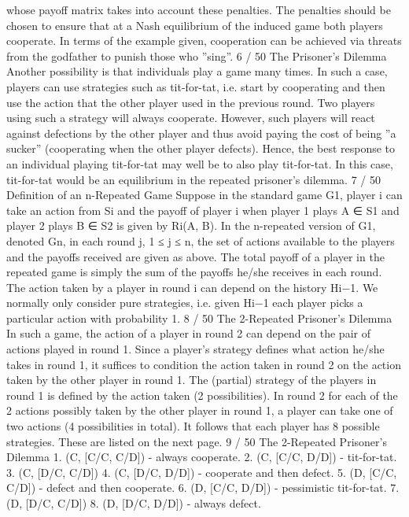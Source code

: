 whose payoff matrix takes into account these penalties.
The penalties should be chosen to ensure that at a Nash
equilibrium of the induced game both players cooperate.
In terms of the example given, cooperation can be achieved via
threats from the godfather to punish those who ”sing”.
6 / 50
The Prisoner’s Dilemma
Another possibility is that individuals play a game many times.
In such a case, players can use strategies such as tit-for-tat, i.e.
start by cooperating and then use the action that the other player
used in the previous round.
Two players using such a strategy will always cooperate. However,
such players will react against defections by the other player and
thus avoid paying the cost of being ”a sucker” (cooperating when
the other player defects).
Hence, the best response to an individual playing tit-for-tat may
well be to also play tit-for-tat. In this case, tit-for-tat would be an
equilibrium in the repeated prisoner’s dilemma.
7 / 50
Definition of an n-Repeated Game
Suppose in the standard game G1, player i can take an action from
Si and the payoff of player i when player 1 plays A ∈ S1 and player
2 plays B ∈ S2 is given by Ri(A, B).
In the n-repeated version of G1, denoted Gn, in each round j,
1 ≤ j ≤ n, the set of actions available to the players and the
payoffs received are given as above.
The total payoff of a player in the repeated game is simply the sum
of the payoffs he/she receives in each round.
The action taken by a player in round i can depend on the history
Hi−1. We normally only consider pure strategies, i.e. given Hi−1
each player picks a particular action with probability 1.
8 / 50
The 2-Repeated Prisoner’s Dilemma
In such a game, the action of a player in round 2 can depend on
the pair of actions played in round 1.
Since a player’s strategy defines what action he/she takes in round
1, it suffices to condition the action taken in round 2 on the action
taken by the other player in round 1.
The (partial) strategy of the players in round 1 is defined by the
action taken (2 possibilities). In round 2 for each of the 2 actions
possibly taken by the other player in round 1, a player can take one
of two actions (4 possibilities in total).
It follows that each player has 8 possible strategies. These are
listed on the next page.
9 / 50
The 2-Repeated Prisoner’s Dilemma
1. (C, [C/C, C/D]) - always cooperate.
2. (C, [C/C, D/D]) - tit-for-tat.
3. (C, [D/C, C/D])
4. (C, [D/C, D/D]) - cooperate and then defect.
5. (D, [C/C, C/D]) - defect and then cooperate.
6. (D, [C/C, D/D]) - pessimistic tit-for-tat.
7. (D, [D/C, C/D])
8. (D, [D/C, D/D]) - always defect.
